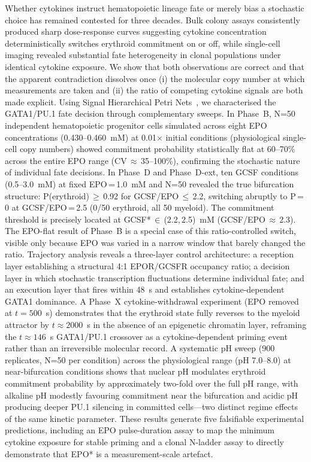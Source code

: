 \documentclass[10pt,letterpaper]{article}
\begin{document}
Whether cytokines instruct hematopoietic lineage fate or merely bias a stochastic choice has remained contested for three decades. Bulk colony assays consistently produced sharp dose-response curves suggesting cytokine concentration deterministically switches erythroid commitment on or off, while single-cell imaging revealed substantial fate heterogeneity in clonal populations under identical cytokine exposure. We show that both observations are correct and that the apparent contradiction dissolves once (i) the molecular copy number at which measurements are taken and (ii) the ratio of competing cytokine signals are both made explicit. Using Signal Hierarchical Petri Nets~\cite{shypn2026}, we characterised the GATA1/PU.1 fate decision through complementary sweeps. In Phase~B, N=50 independent hematopoietic progenitor cells simulated across eight EPO concentrations (0.430--0.460~mM) at 0.01$\times$ initial conditions (physiological single-cell copy numbers) showed commitment probability statistically flat at 60--70\% across the entire EPO range (CV\,$\approx$\,35--100\%), confirming the stochastic nature of individual fate decisions. In Phase~D and Phase~D-ext, ten GCSF conditions (0.5--3.0~mM) at fixed EPO\,=\,1.0~mM and N=50 revealed the true bifurcation structure: P(erythroid)\,$\geq$\,0.92 for GCSF/EPO\,$\leq$\,2.2, switching abruptly to P\,=\,0 at GCSF/EPO\,=\,2.5 (0/50 erythroid, all 50 myeloid). The commitment threshold is precisely located at GCSF*\,$\in$\,(2.2,\,2.5)~mM (GCSF/EPO\,$\approx$\,2.3). The EPO-flat result of Phase~B is a special case of this ratio-controlled switch, visible only because EPO was varied in a narrow window that barely changed the ratio. Trajectory analysis reveals a three-layer control architecture: a reception layer establishing a structural 4:1 EPOR/GCSFR occupancy ratio; a decision layer in which stochastic transcription fluctuations determine individual fate; and an execution layer that fires within 48~s and establishes cytokine-dependent GATA1 dominance. A Phase~X cytokine-withdrawal experiment (EPO removed at $t=500$~s) demonstrates that the erythroid state fully reverses to the myeloid attractor by $t\approx 2000$~s in the absence of an epigenetic chromatin layer, reframing the $t\approx 146$~s GATA1/PU.1 crossover as a cytokine-dependent priming event rather than an irreversible molecular record. A systematic pH sweep (900 replicates, N=50 per condition) across the physiological range (pH 7.0--8.0) at near-bifurcation conditions shows that nuclear pH modulates erythroid commitment probability by approximately two-fold over the full pH range, with alkaline pH modestly favouring commitment near the bifurcation and acidic pH producing deeper PU.1 silencing in committed cells---two distinct regime effects of the same kinetic parameter. These results generate five falsifiable experimental predictions, including an EPO pulse-duration assay to map the minimum cytokine exposure for stable priming and a clonal N-ladder assay to directly demonstrate that EPO* is a measurement-scale artefact.
\end{document}
